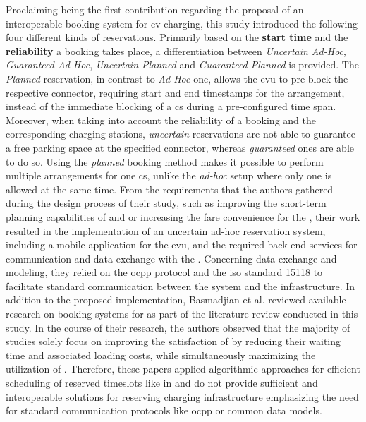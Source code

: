 Proclaiming being the first contribution regarding the proposal of an interoperable booking system for \acrshort{ev} charging, this study introduced the following four different kinds of reservations. Primarily based on the \textbf{start time} and the \textbf{reliability} a booking takes place, a differentiation between \textit{Uncertain Ad-Hoc}, \textit{Guaranteed Ad-Hoc}, \textit{Uncertain Planned} and \textit{Guaranteed Planned} is provided.
The \textit{Planned} reservation, in contrast to \textit{Ad-Hoc} one, allows the \acrshort{evu} to pre-block the respective connector, requiring start and end timestamps for the arrangement, instead of the immediate blocking of a \acrshort{cs} during a pre-configured time span. 
Moreover, when taking into account the reliability of a booking and the corresponding charging stations, \textit{uncertain} reservations are not able to guarantee a free parking space at the specified connector, whereas \textit{guaranteed} ones are able to do so.
Using the \textit{planned} booking method makes it possible to perform multiple arrangements for one \acrshort{cs}, unlike the \textit{ad-hoc} setup where only one is allowed at the same time.
From the requirements that the authors gathered during the design process of their study, such as improving the short-term planning capabilities of  and  or increasing the fare convenience for the , their work resulted in the implementation of an uncertain ad-hoc reservation system, including a mobile application for the \acrshort{evu}, and the required back-end services for communication and data exchange with the .
Concerning data exchange and modeling, they relied on the \acrshort{ocpp} protocol and the \acrshort{iso} standard 15118 to facilitate standard communication between the system and the infrastructure.
In addition to the proposed implementation, Basmadjian et al. reviewed available research on booking systems for  as part of the literature review conducted in this study.
In the course of their research, the authors observed that the majority of studies solely focus on improving the satisfaction of  by reducing their waiting time and associated loading costs, while simultaneously maximizing the utilization of .
Therefore, these papers applied algorithmic approaches for efficient scheduling of reserved timeslots like in \cite{kim_efficient_2010,xiang_reservation-based_2011,qin_charging_2011} and do not provide sufficient and interoperable solutions for reserving charging infrastructure emphasizing the need for standard communication protocols like \acrshort{ocpp} or common data models. 
